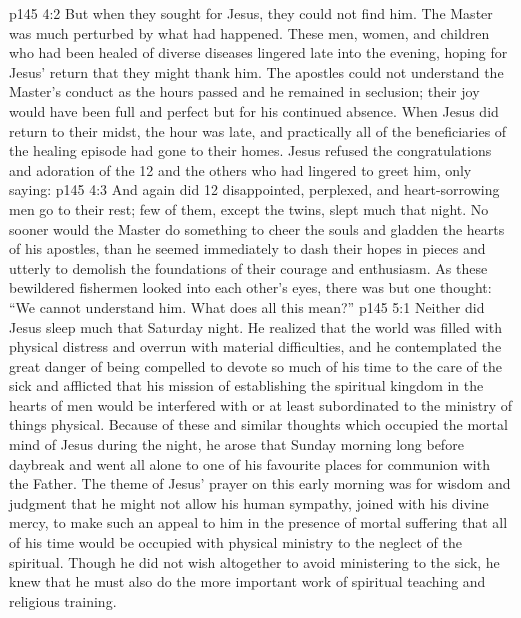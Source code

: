 \vs p145 4:2 But when they sought for Jesus, they could not find him. The Master was much perturbed by what had happened. These men, women, and children who had been healed of diverse diseases lingered late into the evening, hoping for Jesus’ return that they might thank him. The apostles could not understand the Master’s conduct as the hours passed and he remained in seclusion; their joy would have been full and perfect but for his continued absence. When Jesus did return to their midst, the hour was late, and practically all of the beneficiaries of the healing episode had gone to their homes. Jesus refused the congratulations and adoration of the 12 and the others who had lingered to greet him, only saying: 
\vs p145 4:3 And again did 12 disappointed, perplexed, and heart\hyp{}sorrowing men go to their rest; few of them, except the twins, slept much that night. No sooner would the Master do something to cheer the souls and gladden the hearts of his apostles, than he seemed immediately to dash their hopes in pieces and utterly to demolish the foundations of their courage and enthusiasm. As these bewildered fishermen looked into each other’s eyes, there was but one thought: “We cannot understand him. What does all this mean?”
\vs p145 5:1 Neither did Jesus sleep much that Saturday night. He realized that the world was filled with physical distress and overrun with material difficulties, and he contemplated the great danger of being compelled to devote so much of his time to the care of the sick and afflicted that his mission of establishing the spiritual kingdom in the hearts of men would be interfered with or at least subordinated to the ministry of things physical. Because of these and similar thoughts which occupied the mortal mind of Jesus during the night, he arose that Sunday morning long before daybreak and went all alone to one of his favourite places for communion with the Father. The theme of Jesus’ prayer on this early morning was for wisdom and judgment that he might not allow his human sympathy, joined with his divine mercy, to make such an appeal to him in the presence of mortal suffering that all of his time would be occupied with physical ministry to the neglect of the spiritual. Though he did not wish altogether to avoid ministering to the sick, he knew that he must also do the more important work of spiritual teaching and religious training.
